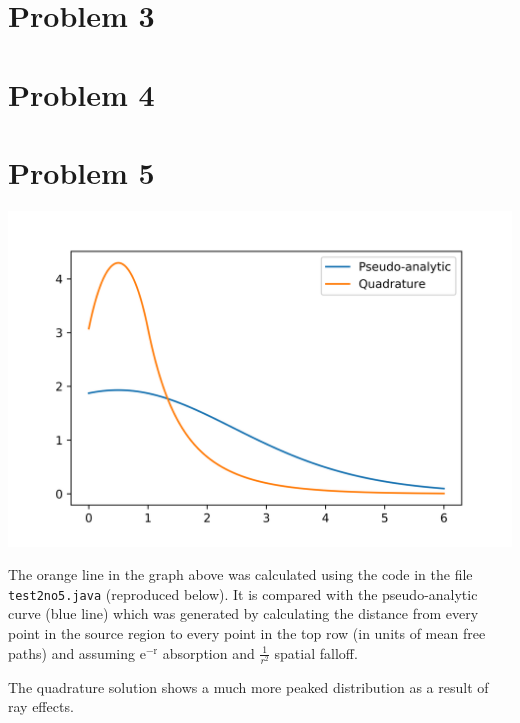 \documentclass{article}
\begin{document}
\section{Problem 3}


\section{Problem 4}

\section{Problem 5}

\includegraphics[width=\textwidth]{no5result}

The orange line in the graph above was calculated using the code in the file \texttt{test2no5.java} (reproduced below). It 
is compared with the pseudo-analytic curve (blue line) which was generated by calculating the 
distance from every point in the source region to every point in the top row (in units of mean free 
paths) and assuming $\mathrm{e^{-r}}$ absorption and $\frac{1}{r^2}$ spatial falloff.

The quadrature solution shows a much more peaked distribution as a result of ray effects.


\end{document}

